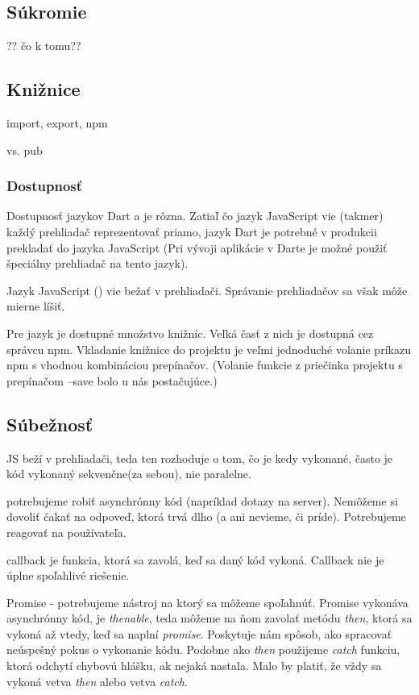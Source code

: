 
\subsection{Súkromie} ?? čo k tomu??
\TODO

\subsection{Knižnice}
\TODO import, export, npm

vs. pub

\subsubsection{Dostupnosť}
Dostupnosť jazykov Dart a \JS{} je rôzna. Zatiaľ čo jazyk JavaScript vie (takmer) každý prehliadač reprezentovať priamo, jazyk Dart je potrebné v produkcii prekladať do jazyka JavaScript (Pri vývoji aplikácie v Darte je možné použiť špeciálny prehliadač na tento jazyk).

Jazyk JavaScript (\JS{}) vie bežať v prehliadači. Správanie prehliadačov sa však môže mierne líšiť.

Pre jazyk \JS{} je dostupné množstvo knižníc. Veľká časť z nich je dostupná cez správcu npm. Vkladanie knižnice do projektu je veľmi jednoduché volanie príkazu npm s vhodnou kombináciou prepínačov. (Volanie funkcie z priečinka projektu s prepínačom --save bolo u nás postačujúce.)


\subsection{Súbežnosť}

JS beží v prehliadači, teda ten rozhoduje o tom, čo je kedy vykonané, často je kód vykonaný sekvenčne(za sebou), nie paralelne.

potrebujeme robiť asynchrónny kód (napríklad dotazy na server). Nemôžeme si dovoliť čakať na odpoveď, ktorá trvá dlho (a ani nevieme, či príde). Potrebujeme reagovať na používateľa.

callback je funkcia, ktorá sa zavolá, keď sa daný kód vykoná. Callback nie je úplne spoľahlivé riešenie.

Promise - potrebujeme nástroj na ktorý sa môžeme spoľahnúť. Promise vykonáva asynchrónny kód, je \emph{thenable}, teda môžeme na ňom zavolať metódu \emph{then}, ktorá sa vykoná až vtedy, keď sa naplní \emph{promise}. Poskytuje nám spôsob, ako spracovať neúspešný pokus o vykonanie kódu. Podobne ako \emph{then} použijeme \emph{catch} funkciu, ktorá odchytí chybovú hlášku, ak nejaká nastala. Malo by platiť, že vždy sa vykoná vetva \emph{then} alebo vetva \emph{catch}.

